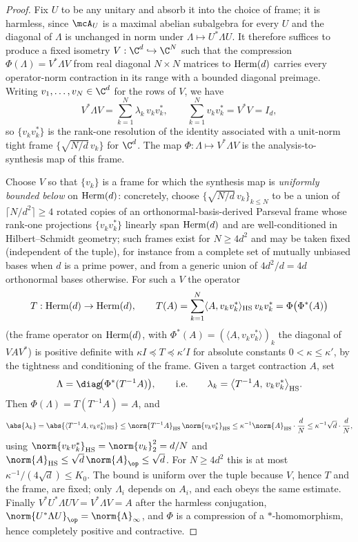 \begin{proof}
Fix $U$ to be any unitary and absorb it into the choice of frame; it is harmless,
since $\mcA_U$ is a maximal abelian subalgebra for every $U$ and the diagonal of
$\Lambda$ is unchanged in norm under $\Lambda\mapsto U^*\Lambda U$. It therefore
suffices to produce a fixed isometry $V:\C^d\hookrightarrow\C^N$ such that the
compression $\Phi(\Lambda)=V^*\Lambda V$ from real diagonal $N\times N$ matrices to
$\mathrm{Herm}(d)$ carries every operator-norm contraction in its range with a bounded
diagonal preimage. Writing $v_1,\ldots,v_N\in\C^d$ for the rows of $V$, we have
\[
V^*\Lambda V=\sum_{k=1}^N\lambda_k\,v_kv_k^*,
\qquad
\sum_{k=1}^N v_kv_k^*=V^*V=I_d,
\]
so $\{v_kv_k^*\}$ is the rank-one resolution of the identity associated with a
unit-norm tight frame $\{\sqrt{N/d}\,v_k\}$ for $\C^d$. The map
$\Phi:\Lambda\mapsto V^*\Lambda V$ is the analysis-to-synthesis map of this frame.

Choose $V$ so that $\{v_k\}$ is a frame for which the synthesis map is
\emph{uniformly bounded below} on $\mathrm{Herm}(d)$: concretely, choose
$\{\sqrt{N/d}\,v_k\}_{k\le N}$ to be a union of $\lceil N/d^2\rceil\ge 4$ rotated
copies of an orthonormal-basis-derived Parseval frame whose rank-one projections
$\{v_kv_k^*\}$ linearly span $\mathrm{Herm}(d)$ and are well-conditioned in
Hilbert--Schmidt geometry; such frames exist for $N\ge 4d^2$ and may be taken
fixed (independent of the tuple), for instance from a complete set of mutually
unbiased bases when $d$ is a prime power, and from a generic union of $4d^2/d=4d$
orthonormal bases otherwise. For such a $V$ the operator
\[
T:\mathrm{Herm}(d)\to\mathrm{Herm}(d),
\qquad
T(A)=\sum_{k=1}^N\langle A,v_kv_k^*\rangle_{\mathrm{HS}}\,v_kv_k^*=\Phi\big(\Phi^*(A)\big)
\]
(the frame operator on $\mathrm{Herm}(d)$, with $\Phi^*(A)=(\langle A,v_kv_k^*\rangle)_k$
the diagonal of $V A V^*$) is positive definite with
$\kappa I\preceq T\preceq \kappa' I$ for absolute constants $0<\kappa\le\kappa'$,
by the tightness and conditioning of the frame. Given a target contraction $A$,
set
\[
\Lambda=\diag\!\big(\Phi^*(T^{-1}A)\big),
\qquad\text{i.e.}\qquad
\lambda_k=\big\langle T^{-1}A,\,v_kv_k^*\big\rangle_{\HS}.
\]
Then $\Phi(\Lambda)=T(T^{-1}A)=A$, and
\[
\abs{\lambda_k}
=\abs{\langle T^{-1}A,v_kv_k^*\rangle_{\HS}}
\le\norm{T^{-1}A}_{\HS}\,\norm{v_kv_k^*}_{\HS}
\le\kappa^{-1}\norm{A}_{\HS}\cdot\frac dN
\le\kappa^{-1}\sqrt d\cdot\frac dN,
\]
using $\norm{v_kv_k^*}_{\HS}=\norm{v_k}_2^2=d/N$ and
$\norm{A}_{\HS}\le\sqrt d\,\norm{A}_{\op}\le\sqrt d$. For $N\ge 4d^2$ this is at
most $\kappa^{-1}/(4\sqrt d)\le K_0$. The bound is uniform over the tuple because
$V$, hence $T$ and the frame, are fixed; only $\Lambda_i$ depends on $A_i$, and
each obeys the same estimate. Finally $V^*U^*\Lambda U V=V^*\Lambda V=A$ after the
harmless conjugation, $\norm{U^*\Lambda U}_{\op}=\norm{\Lambda}_\infty$, and
$\Phi$ is a compression of a $*$-homomorphism, hence completely positive and
contractive.
\end{proof}

